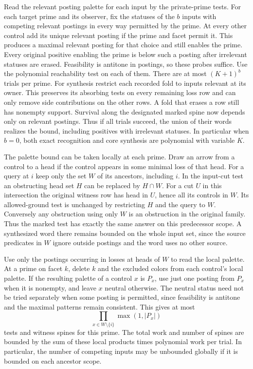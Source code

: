 Read the relevant posting palette for each input by
the private-prime tests. For each target prime and its
observer, fix the statuses of the $b$ inputs with
competing relevant postings in every way permitted by
the prime. At every other control add its unique
relevant posting if the prime and facet permit it.
This produces a maximal relevant posting for that
choice and still enables the prime. Every original
positive enabling the prime is below such a posting
after irrelevant statuses are erased. Feasibility
is antitone in postings, so these probes suffice.
Use the polynomial reachability test on each of them.
There are at most $(K+1)^b$ trials per prime. For synthesis
restrict each recorded fold to inputs relevant at its
owner. This preserves its absorbing tests on every
remaining loss row and can only remove side contributions
on the other rows. A fold that erases a row still has
nonempty support. Survival along the designated marked
spine now depends only on relevant postings. Thus if all
trials succeed, the union of their words realizes the
bound, including positives with irrelevant statuses.
In particular when $b=0$, both exact recognition and
core synthesis are polynomial with variable $K$.

The palette bound can be taken locally at each prime.
Draw an arrow from a control to a head if the control
appears in some minimal loss of that head. For a
query at $i$ keep only the set $W$ of its ancestors,
including $i$. In the input-cut test an obstructing
head set $H$ can be replaced by $H\cap W$. For a cut
$U$ in this intersection the original witness row
has head in $U$, hence all its controls in $W$.
Its allowed-ground test is unchanged by restricting
$H$ and the query to $W$. Conversely any obstruction
using only $W$ is an obstruction in the original
family. Thus the marked test has exactly the same
answer on this predecessor scope. A synthesized word
there remains bounded on the whole input set, since
the source predicates in $W$ ignore outside postings
and the word uses no other source.

Use only the postings occurring in losses at heads
of $W$ to read the local palette. At a prime on
facet $k$, delete $k$ and the excluded colors from
each control's local palette. If the resulting
palette of a control $x$ is $P_x$, use just one
posting from $P_x$ when it is nonempty, and leave
$x$ neutral otherwise. The neutral status need not
be tried separately when some posting is permitted,
since feasibility is antitone and the maximal
patterns remain consistent. This gives at most
\[
                     \prod_{x\in W\setminus\{i\}}\max(1,|P_x|)
\]
tests and witness spines for this prime. The total
work and number of spines are bounded by the sum
of these local products times polynomial work per
trial. In particular, the number of competing
inputs may be unbounded globally if it is bounded
on each ancestor scope.

